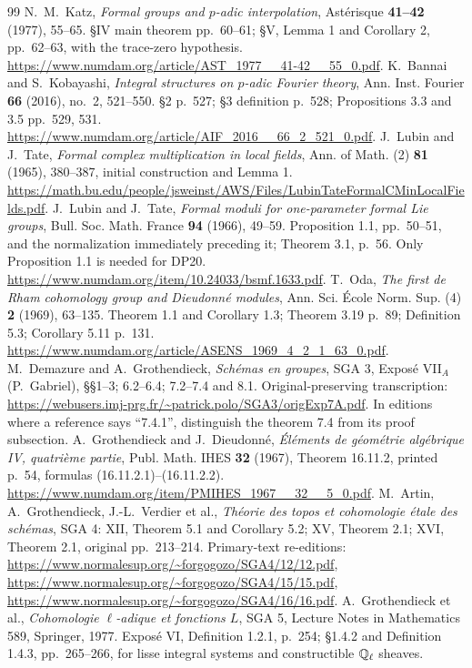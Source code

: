 \documentclass[11pt,a4paper]{article}
\theoremstyle{definition}\newtheorem{remark}[theorem]{Remark}
\begin{document}
\begin{thebibliography}{99}
 N.~M.~Katz, \emph{Formal groups and $p$-adic interpolation}, Ast\'erisque \textbf{41--42} (1977), 55--65. \S IV main theorem pp.~60--61; \S V, Lemma 1 and Corollary 2, pp.~62--63, with the trace-zero hypothesis. \url{https://www.numdam.org/article/AST_1977__41-42__55_0.pdf}.
 K.~Bannai and S.~Kobayashi, \emph{Integral structures on $p$-adic Fourier theory}, Ann. Inst. Fourier \textbf{66} (2016), no.~2, 521--550. \S2 p.~527; \S3 definition p.~528; Propositions 3.3 and 3.5 pp.~529, 531. \url{https://www.numdam.org/article/AIF_2016__66_2_521_0.pdf}.
 J.~Lubin and J.~Tate, \emph{Formal complex multiplication in local fields}, Ann. of Math. (2) \textbf{81} (1965), 380--387, initial construction and Lemma 1. \url{https://math.bu.edu/people/jsweinst/AWS/Files/LubinTateFormalCMinLocalFields.pdf}.
 J.~Lubin and J.~Tate, \emph{Formal moduli for one-parameter formal Lie groups}, Bull. Soc. Math. France \textbf{94} (1966), 49--59. Proposition 1.1, pp.~50--51, and the normalization immediately preceding it; Theorem 3.1, p.~56. Only Proposition 1.1 is needed for DP20. \url{https://www.numdam.org/item/10.24033/bsmf.1633.pdf}.
 T.~Oda, \emph{The first de Rham cohomology group and Dieudonn\'e modules}, Ann. Sci. \'Ecole Norm. Sup. (4) \textbf{2} (1969), 63--135. Theorem 1.1 and Corollary 1.3; Theorem 3.19 p.~89; Definition 5.3; Corollary 5.11 p.~131. \url{https://www.numdam.org/article/ASENS_1969_4_2_1_63_0.pdf}.
 M.~Demazure and A.~Grothendieck, \emph{Sch\'emas en groupes}, SGA 3, Expos\'e VII$_A$ (P.~Gabriel), \S\S1--3; 6.2--6.4; 7.2--7.4 and 8.1. Original-preserving transcription: \url{https://webusers.imj-prg.fr/~patrick.polo/SGA3/origExp7A.pdf}. In editions where a reference says ``7.4.1'', distinguish the theorem 7.4 from its proof subsection.
 A.~Grothendieck and J.~Dieudonn\'e, \emph{\'El\'ements de g\'eom\'etrie alg\'ebrique IV, quatri\`eme partie}, Publ. Math. IHES \textbf{32} (1967), Theorem 16.11.2, printed p.~54, formulas (16.11.2.1)--(16.11.2.2). \url{https://www.numdam.org/item/PMIHES_1967__32__5_0.pdf}.
 M.~Artin, A.~Grothendieck, J.-L.~Verdier et al., \emph{Th\'eorie des topos et cohomologie \'etale des sch\'emas}, SGA 4: XII, Theorem 5.1 and Corollary 5.2; XV, Theorem 2.1; XVI, Theorem 2.1, original pp.~213--214. Primary-text re-editions: \url{https://www.normalesup.org/~forgogozo/SGA4/12/12.pdf}, \url{https://www.normalesup.org/~forgogozo/SGA4/15/15.pdf}, \url{https://www.normalesup.org/~forgogozo/SGA4/16/16.pdf}.
 A.~Grothendieck et al., \emph{Cohomologie $\ell$-adique et fonctions $L$}, SGA 5, Lecture Notes in Mathematics 589, Springer, 1977. Expos\'e VI, Definition 1.2.1, p.~254; \S1.4.2 and Definition 1.4.3, pp.~265--266, for lisse integral systems and constructible $\mathbb Q_\ell$ sheaves.

\end{thebibliography}
\end{document}
